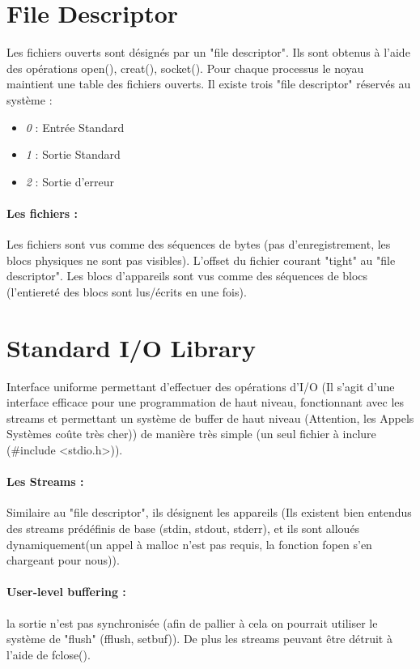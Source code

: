 \documentclass{article}[12pt]
\begin{document}
\section{File Descriptor}
Les fichiers ouverts sont désignés par un "file descriptor". Ils sont obtenus à l'aide des opérations open(), creat(), socket(). Pour chaque processus le noyau maintient une table des fichiers ouverts. Il existe trois "file descriptor" réservés au système : 
\begin{itemize}
	\item \emph{0} : Entrée Standard
	\item \emph{1} : Sortie Standard
	\item \emph{2} : Sortie d'erreur
\end{itemize}
\paragraph{Les fichiers : }
Les fichiers sont vus comme des séquences de bytes (pas d'enregistrement, les blocs physiques ne sont pas visibles). L'offset du fichier courant "tight" au "file descriptor". Les blocs d'appareils sont vus comme des séquences de blocs (l'entiereté des blocs sont lus/écrits en une fois).
\section{Standard I/O Library}
Interface uniforme permettant d'effectuer des opérations d'I/O (Il s'agit d'une interface efficace pour une programmation de haut niveau, fonctionnant avec les streams et permettant un système de buffer de haut niveau (Attention, les Appels Systèmes coûte très cher)) de manière très simple (un seul fichier à inclure (\#include <stdio.h>)).
\paragraph{Les Streams : }
Similaire au "file descriptor", ils désignent les appareils (Ils existent bien entendus des streams prédéfinis de base (stdin, stdout, stderr), et ils sont alloués dynamiquement(un appel à malloc n'est pas requis, la fonction fopen s'en chargeant pour nous)).
\paragraph{User-level buffering : } la sortie n'est pas synchronisée (afin de pallier à cela on pourrait utiliser le système de "flush" (fflush, setbuf)). De plus les streams peuvant être détruit à l'aide de fclose().
\end{document}
